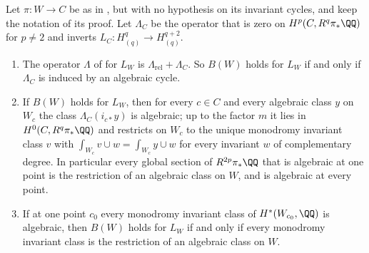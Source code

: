\begin{theorem}\label{thm:lefschetzpropagation}
Let $\pi\colon W\to C$ be as in , but with no
hypothesis on its invariant cycles, and keep the notation of its proof. Let
$\Lambda_{C}$ be the operator that is zero on $H^{p}(C,R^{q}\pi_{*}\QQ)$ for
$p\ne2$ and inverts $L_{C}\colon H^{q}_{(q)}\to H^{q+2}_{(q)}$.
\begin{enumerate}[label=\textup{(\roman*)},leftmargin=2.6em,itemsep=2pt]
\item The operator $\Lambda$ of \cite[Definition~10.6]{paperI} for $L_{W}$ is
  $\Lambda_{\mathrm{rel}}+\Lambda_{C}$. So $B(W)$ holds for $L_{W}$ if and
  only if $\Lambda_{C}$ is induced by an algebraic cycle.
\item If $B(W)$ holds for $L_{W}$, then for every $c\in C$ and every algebraic
  class $y$ on $W_{c}$ the class $\Lambda_{C}(i_{c*}y)$ is algebraic; up to
  the factor $m$ it lies in $H^{0}(C,R^{q}\pi_{*}\QQ)$ and restricts on
  $W_{c}$ to the unique monodromy invariant class $v$ with
  $\int_{W_{c}}v\cup w=\int_{W_{c}}y\cup w$ for every invariant $w$ of
  complementary degree. In particular every global section of
  $R^{2p}\pi_{*}\QQ$ that is algebraic at one point is the restriction of an
  algebraic class on $W$, and is algebraic at every point.
\item If at one point $c_{0}$ every monodromy invariant class of
  $H^{*}(W_{c_{0}},\QQ)$ is algebraic, then $B(W)$ holds for $L_{W}$ if and
  only if every monodromy invariant class is the restriction of an algebraic
  class on $W$.
\end{enumerate}
\end{theorem}

